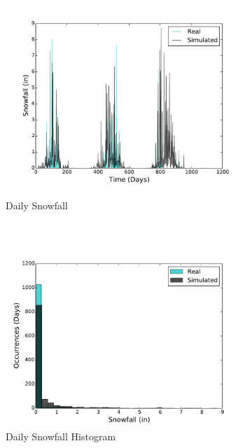 \documentclass[11pt, letterpaper]{article}
\begin{document}
\begin{figure}[H]
\begin{subfigure}[b]{0.45\textwidth}
  \end{subfigure}
  ~
  \begin{subfigure}[b]{0.45\textwidth}
    \includegraphics[width=\textwidth]{figures/daily_snowfall.pdf}
    \label{fig:analysis-raw}
    \caption{Daily Snowfall}
  \end{subfigure}
  ~
  \begin{subfigure}[b]{0.45\textwidth}
    \includegraphics[width=\textwidth]{figures/daily_snowfall_hist}
    \caption{Daily Snowfall Histogram}
  \end{subfigure}
  ~
  \begin{subfigure}[b]{0.45\textwidth}

\end{subfigure}
\end{figure}
\end{document}
